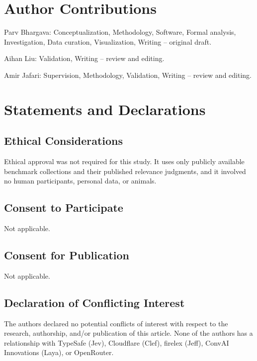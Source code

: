 \documentclass[12pt,a4paper]{article}
\begin{document}
\section*{Author Contributions}

Parv Bhargava: Conceptualization, Methodology, Software, Formal analysis, Investigation, Data curation, Visualization, Writing -- original draft.

Aihan Liu: Validation, Writing -- review and editing.

Amir Jafari: Supervision, Methodology, Validation, Writing -- review and editing.

\section*{Statements and Declarations}

\subsection*{Ethical Considerations}

Ethical approval was not required for this study. It uses only publicly available benchmark collections and their published relevance judgments, and it involved no human participants, personal data, or animals.

\subsection*{Consent to Participate}

Not applicable.

\subsection*{Consent for Publication}

Not applicable.

\subsection*{Declaration of Conflicting Interest}

The authors declared no potential conflicts of interest with respect to the research, authorship, and/or publication of this article. None of the authors has a relationship with TypeSafe (Jev), Cloudflare (Clef), firelex (Jeff), ConvAI Innovations (Laya), or OpenRouter.
\end{document}
